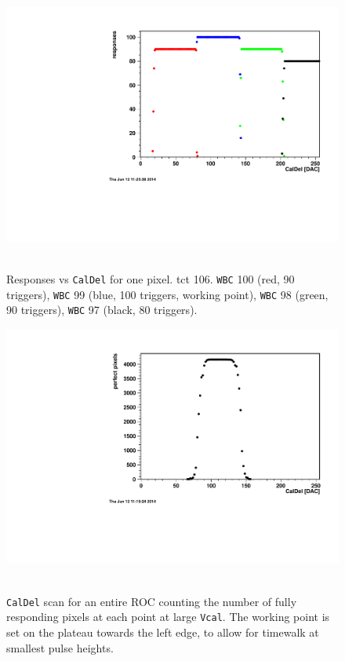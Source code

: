 \documentclass[english]{article}
\begin{document}
%
\begin{figure}[h]
 \hfill{}\includegraphics[bb=0bp 0bp 567bp 480bp,scale=0.66]{c405-caldel-wbc-97-98-99-100}\hfill{}~

\protect\caption{Responses vs \texttt{CalDel} for one pixel. tct 106. \texttt{WBC}
100 (red, 90 triggers), \texttt{WBC} 99 (blue, 100 triggers, working
point), \texttt{WBC} 98 (green, 90 triggers), \texttt{WBC} 97 (black,
80 triggers).}
%
\end{figure}


%
\begin{figure}[h]
 \hfill{}\includegraphics[bb=0bp 0bp 567bp 425bp,scale=0.5]{c405-caldelroc}\hfill{}~\protect\caption{\texttt{CalDel} scan for an entire ROC counting the number of fully
responding pixels at each point at large \texttt{Vcal}. The working
point is set on the plateau towards the left edge, to allow for timewalk
at smallest pulse heights.}
%
\end{figure}
\end{document}
